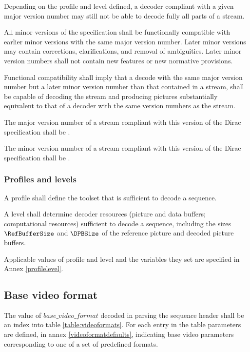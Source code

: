 Depending on the profile and level defined, a decoder compliant 
with a given major version number may still not be able to decode 
fully all parts of a stream.

All minor versions of the specification shall be functionally compatible 
with earlier minor versions with the same major version number. Later minor 
versions may contain corrections, clarifications, and removal of ambiguities. 
Later minor version numbers shall not contain new features or new 
normative provisions.

Functional compatibility shall imply that a decode with the same major version
number but a later minor version number than that contained in a stream, shall
be capable of decoding the stream and producing pictures substantially equivalent
to that of a decoder with the same version numbers as the stream.

The major version number of a stream compliant with this version 
of the Dirac specification shall be \MajorVersion.

The minor version number of a stream compliant with this version 
of the Dirac specification shall be \MinorVersion.


\subsubsection{Profiles and levels}

A profile shall define the toolset that is sufficient to decode a sequence. 

A level shall determine decoder resources (picture and data buffers; computational resources) sufficient
to decode a sequence, including the sizes $\RefBufferSize$ and $\DPBSize$ of 
the reference picture and decoded picture buffers. 

Applicable values of profile and level and the variables they set are specified in Annex
\ref{profilelevel}.

\subsection{Base video format}
\label{videoformat}

The value of $base\_video\_format$ decoded in parsing the sequence header shall be 
an index into table \ref{table:videoformats}. For each entry in the table 
parameters are defined, in annex \ref{videoformatdefaults}, indicating base
video parameters corresponding to one of a set of predefined formats. 

